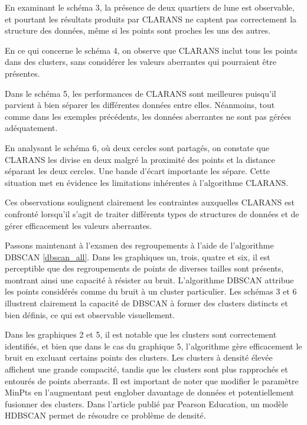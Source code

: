 \documentclass[
  oneside]{memoire-umons}
\begin{document}
En examinant le schéma 3, la présence de deux quartiers de lune est
observable, et pourtant les résultats produits par CLARANS ne captent
pas correctement la structure des données, même si les points sont
proches les uns des autres.

En ce qui concerne le schéma 4, on observe que CLARANS inclut tous les
points dans des clusters, sans considérer les valeurs aberrantes qui
pourraient être présentes.

Dans le schéma 5, les performances de CLARANS sont meilleures puisqu'il
parvient à bien séparer les différentes données entre elles. Néanmoins,
tout comme dans les exemples précédents, les données aberrantes ne sont
pas gérées adéquatement.

En analysant le schéma 6, où deux cercles sont partagés, on constate que
CLARANS les divise en deux malgré la proximité des points et la distance
séparant les deux cercles. Une bande d'écart importante les sépare.
Cette situation met en évidence les limitations inhérentes à
l'algorithme CLARANS.

Ces observations soulignent clairement les contraintes auxquelles
CLARANS est confronté lorsqu'il s'agit de traiter différents types de
structures de données et de gérer efficacement les valeurs aberrantes.

Passons maintenant à l'examen des regroupements à l'aide de l'algorithme
DBSCAN \ref{dbscan_all}. Dans les graphiques un, trois, quatre et six,
il est perceptible que des regroupements de points de diverses tailles
sont présents, montrant ainsi une capacité à résister au bruit.
L'algorithme DBSCAN attribue les points considérés comme du bruit à un
cluster particulier. Les schémas 3 et 6 illustrent clairement la
capacité de DBSCAN à former des clusters distincts et bien définis, ce
qui est observable visuellement.

Dans les graphiques 2 et 5, il est notable que les clusters sont
correctement identifiés, et bien que dans le cas du graphique 5,
l'algorithme gère efficacement le bruit en excluant certains points des
clusters. Les clusters à densité élevée affichent une grande compacité,
tandis que les clusters sont plus rapprochés et entourés de points
aberrants. Il est important de noter que modifier le paramètre MinPts en
l'augmentant peut englober davantage de données et potentiellement
fusionner des clusters. Dans l'article publié par Pearson
Education, un modèle HDBSCAN permet de
résoudre ce problème de densité.
\end{document}
